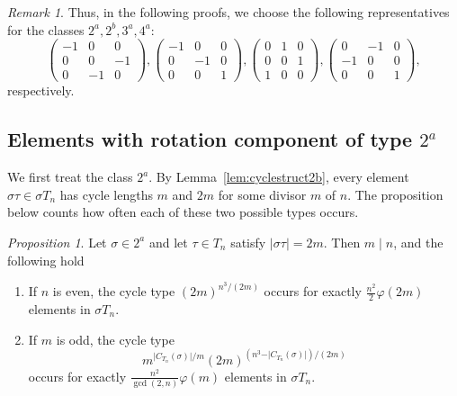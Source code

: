 \documentclass[12pt]{article}
\theoremstyle{definition}
\theoremstyle{remark}
\newtheorem{remark}[theorem]{Remark}
\newtheorem{proposition}[theorem]{Proposition}
\begin{document}
\begin{remark}
{Thus, in the following proofs, we choose the following representatives for the classes $2^a,2^b,3^a,4^a$:}
\[
\begin{pmatrix}
  -1 &   0 &   0 \\
     0&    0&  -1 \\
   0&  -1&   0
\end{pmatrix},
\begin{pmatrix} -1 & 0 & 0 \\
0 & -1 & 0 \\
0 & 0 & 1
\end{pmatrix},
\begin{pmatrix}
  0 &   1 &   0 \\
     0&    0&  1 \\
   1&  0&   0
\end{pmatrix},
\begin{pmatrix} 0 & -1 & 0 \\
-1 & 0 & 0 \\
0 & 0 & 1
\end{pmatrix},
\]
respectively.
\end{remark}





\subsection{Elements with rotation component of type $2^a$}

We first treat the class $2^a$.
By Lemma~\ref{lem:cyclestruct2b}, every element $\sigma\tau\in\sigma T_n$ has cycle lengths $m$ and $2m$ for some divisor $m$ of $n$.
The proposition below counts how often each of these two possible types occurs.



\begin{proposition}\label{prop:cycle-2a}
Let $\sigma\in 2^a$ and let $\tau\in T_n$ satisfy $\vert\sigma\tau\vert=2m$.
Then $m\mid n$, and the following hold
\begin{enumerate}
\item[(a)] If $n$ is even, the cycle type
$(2m)^{n^3/(2m)}$
occurs for exactly $\frac{n^2}{2}\varphi(2m)$ elements in $\sigma T_n$.
\item[(b)] If $m$ is odd, the cycle type
\[
m^{\vert C_{T_n}(\sigma)\vert/m}
(2m)^{(n^3-\vert C_{T_n}(\sigma)\vert)/(2m)}
\]
occurs for exactly $\frac{n^2}{\gcd(2,n)}\varphi(m)$ elements in $\sigma T_n$.
\end{enumerate}
\end{proposition}
\end{document}
